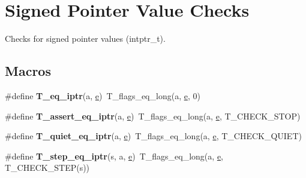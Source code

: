 \hypertarget{group__RTEMSTestFrameworkChecksIntptr}{}\section{Signed Pointer Value Checks}
\label{group__RTEMSTestFrameworkChecksIntptr}


Checks for signed pointer values (intptr\+\_\+t).  


\subsection*{Macros}
\begin{DoxyCompactItemize}
\item 
\mbox{\label{group__RTEMSTestFrameworkChecksIntptr_ga0d035aabd55c0f2c127e4403ebdeda84}} 
\#define {\bfseries T\+\_\+eq\+\_\+iptr}(a,  \mbox{\hyperlink{sun4u_2tte_8h_a8b0b9ed08e0e18920ec2682f48228c27}{e}})~T\+\_\+flags\+\_\+eq\+\_\+long(a, \mbox{\hyperlink{sun4u_2tte_8h_a8b0b9ed08e0e18920ec2682f48228c27}{e}}, 0)
\item 
\mbox{\label{group__RTEMSTestFrameworkChecksIntptr_ga586eb1b3fe4d6f3ff3e808915c8e5678}} 
\#define {\bfseries T\+\_\+assert\+\_\+eq\+\_\+iptr}(a,  \mbox{\hyperlink{sun4u_2tte_8h_a8b0b9ed08e0e18920ec2682f48228c27}{e}})~T\+\_\+flags\+\_\+eq\+\_\+long(a, \mbox{\hyperlink{sun4u_2tte_8h_a8b0b9ed08e0e18920ec2682f48228c27}{e}}, T\+\_\+\+C\+H\+E\+C\+K\+\_\+\+S\+T\+OP)
\item 
\mbox{\label{group__RTEMSTestFrameworkChecksIntptr_gac41e11b91adb55bd866a354f26f5fe74}} 
\#define {\bfseries T\+\_\+quiet\+\_\+eq\+\_\+iptr}(a,  \mbox{\hyperlink{sun4u_2tte_8h_a8b0b9ed08e0e18920ec2682f48228c27}{e}})~T\+\_\+flags\+\_\+eq\+\_\+long(a, \mbox{\hyperlink{sun4u_2tte_8h_a8b0b9ed08e0e18920ec2682f48228c27}{e}}, T\+\_\+\+C\+H\+E\+C\+K\+\_\+\+Q\+U\+I\+ET)
\item 
\mbox{\label{group__RTEMSTestFrameworkChecksIntptr_ga0d5c8044f21d2e3d7ddd1e284d920d07}} 
\#define {\bfseries T\+\_\+step\+\_\+eq\+\_\+iptr}(s,  a,  \mbox{\hyperlink{sun4u_2tte_8h_a8b0b9ed08e0e18920ec2682f48228c27}{e}})~T\+\_\+flags\+\_\+eq\+\_\+long(a, \mbox{\hyperlink{sun4u_2tte_8h_a8b0b9ed08e0e18920ec2682f48228c27}{e}}, T\+\_\+\+C\+H\+E\+C\+K\+\_\+\+S\+T\+EP(s))

\end{DoxyCompactItemize}
